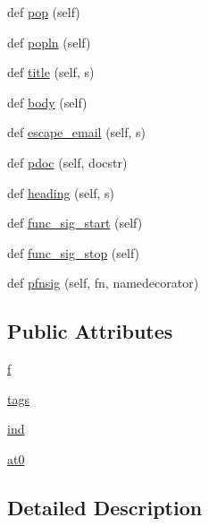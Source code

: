 \begin{DoxyCompactItemize}
def \hyperlink{classnesdoc_1_1html_1_1_html_a90f8e8d614f8a0de4a64bdb57c25e91f}{pop} (self)
\item 
def \hyperlink{classnesdoc_1_1html_1_1_html_af4317f79190dfa50f612fa5e08cc15ce}{popln} (self)
\item 
def \hyperlink{classnesdoc_1_1html_1_1_html_ae774eda9eb5f1d3e5355ca17b2e9b990}{title} (self, s)
\item 
def \hyperlink{classnesdoc_1_1html_1_1_html_a333d799980f81455615821a1f9eb1a86}{body} (self)
\item 
def \hyperlink{classnesdoc_1_1html_1_1_html_af1110be820eba8f28de2b01f4dd5bd1d}{escape\+\_\+email} (self, s)
\item 
def \hyperlink{classnesdoc_1_1html_1_1_html_a08d8d12656b60360ec06617631bcb230}{pdoc} (self, docstr)
\item 
def \hyperlink{classnesdoc_1_1html_1_1_html_ab3b3149a029e5cee5050e95b43248f0b}{heading} (self, s)
\item 
def \hyperlink{classnesdoc_1_1html_1_1_html_a27fd008a4bbdecac7dc834a0109fcb27}{func\+\_\+sig\+\_\+start} (self)
\item 
def \hyperlink{classnesdoc_1_1html_1_1_html_adf6bfafc9d1be2c04a4d7a8acd622755}{func\+\_\+sig\+\_\+stop} (self)
\item 
def \hyperlink{classnesdoc_1_1html_1_1_html_ad4a3e66be8828778b7b4c933893c07af}{pfnsig} (self, fn, namedecorator)
\end{DoxyCompactItemize}
\subsection*{Public Attributes}
\begin{DoxyCompactItemize}
\item 
\hyperlink{classnesdoc_1_1html_1_1_html_a33017817dcc3a443f2d69f7af11e936e}{f}
\item 
\hyperlink{classnesdoc_1_1html_1_1_html_a3a6c5ca8b589342e34292ac677ae65a9}{tags}
\item 
\hyperlink{classnesdoc_1_1html_1_1_html_ad211bb29eaa1675a0774d5ec5c396c45}{ind}
\item 
\hyperlink{classnesdoc_1_1html_1_1_html_a900f64dda6fe1fb2bc5269dd881904b4}{at0}
\end{DoxyCompactItemize}


\subsection{Detailed Description}


